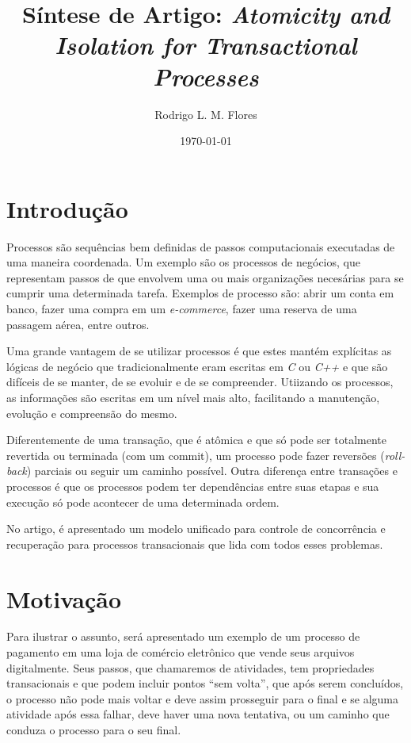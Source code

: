 \documentclass[a4paper,12pt,notitlepage]{article}
\title{Síntese de Artigo: \textit{Atomicity and Isolation for Transactional Processes}}
\author{Rodrigo L. M. Flores}
\date{\today}
\begin{document}
\maketitle

\section{Introdução}

Processos são sequências bem definidas de passos computacionais executadas de uma maneira coordenada. Um exemplo são os processos de negócios, que representam passos de que envolvem uma ou mais organizações necesárias para se cumprir uma determinada tarefa. Exemplos de processo são: abrir um conta em banco, fazer uma compra em um \textit{e-commerce}, fazer uma reserva de uma passagem aérea, entre outros. 

Uma grande vantagem de se utilizar processos é que estes mantém explícitas as lógicas de negócio que tradicionalmente eram escritas em \textit{C} ou \textit{C++}  e que são difíceis de se manter, de se evoluir e de se compreender. Utiizando os processos, as informações são escritas em um nível mais alto, facilitando a manutenção, evolução e compreensão do mesmo. 

Diferentemente de uma transação, que é atômica e que só pode ser totalmente revertida ou terminada (com um commit),  um processo pode fazer reversões (\textit{roll-back}) parciais ou seguir um caminho possível. Outra diferença entre transações e processos é que os processos podem ter dependências entre suas etapas e sua execução só pode acontecer de uma determinada ordem. 

No artigo, é apresentado um modelo unificado para controle de concorrência e recuperação para processos transacionais que lida com todos esses problemas.

\newpage

\section{Motivação}

Para ilustrar o assunto, será apresentado um exemplo de um processo de pagamento em uma loja de comércio eletrônico que vende seus arquivos digitalmente. Seus passos, que chamaremos de atividades, tem propriedades transacionais e que podem incluir pontos ``sem volta'', que após serem concluídos, o processo não pode mais voltar e deve assim prosseguir para o final e se alguma atividade após essa falhar, deve haver uma nova tentativa, ou um caminho que conduza o processo para o seu final. 
\end{document}
